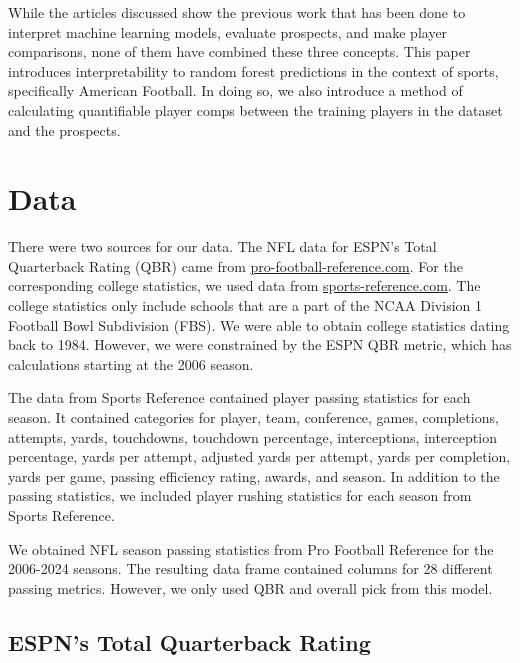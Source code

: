\documentclass{article}
\begin{document}
While the articles discussed show the previous work that has been done to interpret machine learning models, evaluate prospects, and make player comparisons, none of them have combined these three concepts. This paper introduces interpretability to random forest predictions in the context of sports, specifically American Football. In doing so, we also introduce a method of calculating quantifiable player comps between the training players in the dataset and the prospects. 

\section{Data}

There were two sources for our data. The NFL data for ESPN's Total Quarterback Rating (QBR) came from \href{https://pro-football-reference.com}{pro-football-reference.com}. For the corresponding college statistics, we used data from \href{https://sports-reference.com}{sports-reference.com}. The college statistics only include schools that are a part of the NCAA Division 1 Football Bowl Subdivision (FBS). We were able to obtain college statistics dating back to 1984. However, we were constrained by the ESPN QBR metric, which has calculations starting at the 2006 season.

The data from Sports Reference contained player passing statistics for each season. It contained categories for player, team, conference, games, completions, attempts, yards, touchdowns, touchdown percentage, interceptions, interception percentage, yards per attempt, adjusted yards per attempt, yards per completion, yards per game, passing efficiency rating, awards, and season. In addition to the passing statistics, we included player rushing statistics for each season from Sports Reference.

We obtained NFL season passing statistics from Pro Football Reference for the 2006-2024 seasons. The resulting data frame contained columns for 28 different passing metrics. However, we only used QBR and overall pick from this model.

\subsection{ESPN's Total Quarterback Rating}
\end{document}
